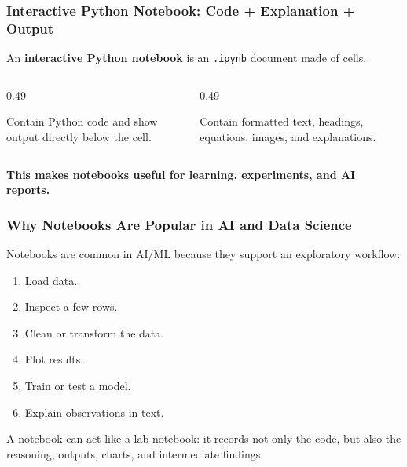 \documentclass[aspectratio=169,10pt]{beamer}
\newcommand{\keyword}[1]{\textcolor{PrimaryBlue}{\textbf{#1}}}
\begin{document}
\begin{frame}
\frametitle{Interactive Python Notebook: Code + Explanation + Output}
\vspace{1.0cm}
An \keyword{interactive Python notebook} is an \texttt{.ipynb} document made of cells.
\vspace{0.35cm}
\begin{columns}[T,totalwidth=\textwidth]
\begin{column}{0.49\textwidth}
\begin{tcolorbox}[lecturebox,title=Code cells]
Contain Python code and show output directly below the cell.
\end{tcolorbox}
\end{column}
\begin{column}{0.49\textwidth}
\begin{tcolorbox}[lecturebox,title=Markdown cells]
Contain formatted text, headings, equations, images, and explanations.
\end{tcolorbox}
\end{column}
\end{columns}
\vspace{0.45cm}
\begin{center}
\textbf{This makes notebooks useful for learning, experiments, and AI reports.}
\end{center}
\end{frame}


\begin{frame}
\frametitle{Why Notebooks Are Popular in AI and Data Science}
\vspace{0.25cm}
Notebooks are common in AI/ML because they support an exploratory workflow:
\begin{enumerate}\setlength\itemsep{0.13cm}
  \item Load data.
  \item Inspect a few rows.
  \item Clean or transform the data.
  \item Plot results.
  \item Train or test a model.
  \item Explain observations in text.
\end{enumerate}
\vspace{0.25cm}
\begin{tcolorbox}[lecturebox,title=AI/ML connection]
A notebook can act like a lab notebook: it records not only the code, but also the reasoning, outputs, charts, and intermediate findings.
\end{tcolorbox}
\end{frame}
\end{document}
